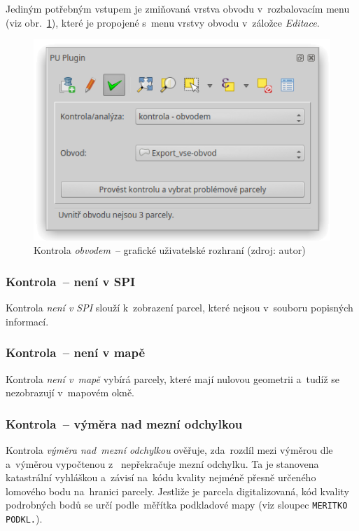 Jediným potřebným vstupem je zmiňovaná vrstva obvodu v~rozbalovacím
menu (viz obr.~\ref{fig:manual_kontrola_obvodem_gui}), které je
propojené s~menu vrstvy obvodu v~záložce \textit{Editace}.

	\begin{figure}[H] \centering
		\includegraphics[width=.55\textwidth]{./pictures/kontrola-obvodem.png}
		\caption[Kontrola \textit{obvodem}~– grafické
uživatelské rozhraní]{Kontrola \textit{obvodem}~– grafické uživatelské
rozhraní (zdroj: autor)}
		\label{fig:manual_kontrola_obvodem_gui}
 	\end{figure}

\subsubsection{Kontrola~– není v SPI}
\label{manual_kontrola_neni_v_spi}

Kontrola \textit{není v SPI} slouží k~zobrazení parcel, které nejsou
v~souboru popisných informací.

\subsubsection{Kontrola~– není v mapě}
\label{manual_kontrola_neni_v_mape}

Kontrola \textit{není v~mapě} vybírá parcely, které mají nulovou
geometrii a~tudíž se nezobrazují v~mapovém okně.

\subsubsection{Kontrola~– výměra nad mezní odchylkou}
\label{manual_kontrola_vymera}

Kontrola \textit{výměra nad~mezní odchylkou} ověřuje, zda~rozdíl mezi
výměrou dle~ a~výměrou vypočtenou z~ nepřekračuje
mezní odchylku. Ta je stanovena kata\-strální vyhláškou a~závisí na~kódu
kvality nejméně přesně určeného lomového bodu na~hranici
parcely. Jestliže je parcela digitalizovaná, kód kvality podrobných
bodů se určí podle~měřítka podkladové mapy (viz sloupec
\texttt{MERITKO PODKL.}).

